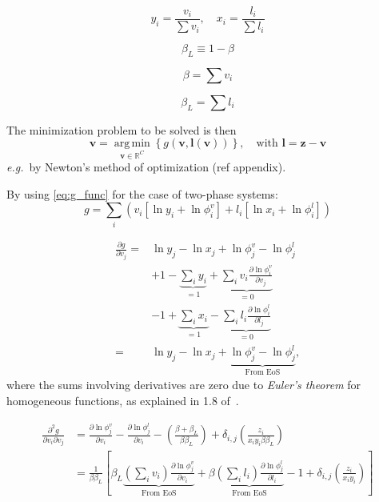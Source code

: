 \documentclass[english]{../thermomemo/thermomemo}
\newcommand*{\vektor}[1]{\boldsymbol{#1}}%
\DeclareMathOperator*{\argmin}{arg\,min }
\begin{document}
\begin{equation}
  y_i = \frac{v_i}{\sum v_i}, \quad x_i = \frac{l_i}{\sum l_i}
  \label{}
\end{equation}

\begin{equation}
  \beta_L \equiv 1-\beta
  \label{}
\end{equation}

\begin{equation}
  \beta = \sum v_i
  \label{}
\end{equation}

\begin{equation}
  \beta_L = \sum l_i
  \label{}
\end{equation}

The minimization problem to be solved is then 
\begin{equation}
  \vektor{v} = \underset{\vektor{v} \in \mathbb{R}^C}{\argmin}\left\{g(\vektor{v},\vektor{l}(\vektor{v}))\right\}, \quad\text{with } 
  \vektor{l} = \vektor{z}-\vektor{v}
  \label{}
\end{equation}
\textit{e.g.}\ by Newton's method of optimization (ref appendix).


By using \eqref{eq:g_func} for the case of two-phase systems:
\begin{equation}
  g = \sum_i \left( v_i \left[ \ln y_i + \ln \phi_i^v \right] + l_i \left[ \ln x_i + \ln \phi_i^l \right] \right)
  \label{eq:g_twophase}
\end{equation}

\begin{align}
  \frac{\partial g}{\partial v_j}
  =& \ln y_j - \ln x_j + \ln \phi_j^v - \ln \phi_j^l \nonumber\\
  &+ 1 - \underbrace{\sum_i y_i}_{=1} + \underbrace{\sum_i v_i \frac{\partial \ln \phi_i^v}{\partial v_j}}_{=0}\nonumber\\
  &- 1 + \underbrace{\sum_i x_i}_{=1} - \underbrace{\sum_i l_i \frac{\partial \ln \phi_i^l}{\partial l_j}}_{=0} \nonumber\\
  =& \ln y_j - \ln x_j + \underbrace{\ln \phi_j^v - \ln \phi_j^l}_{\text{From EoS}},
  \label{}
\end{align}
where the sums involving derivatives are zero due to \textit{Euler's theorem} for homogeneous functions, as explained in
1.8 of~\cite{michelsen07}.

\begin{align}
  \frac{\partial^2 g}{\partial v_i \partial v_j} 
  &= \frac{\partial \ln \phi_j^v}{\partial v_i} - \frac{\partial \ln \phi_j^l}{\partial v_i}  
  - \left( \frac{\beta + \beta_L}{\beta \beta_L} \right)
  + \delta_{i,j} \left( \frac{z_i}{x_i y_i \beta \beta_L} \right) \nonumber\\
  &= 
  \frac{1}{\beta \beta_L} \left[
  \beta_L \underbrace{\left( \sum_i v_i\right)  \frac{\partial \ln \phi_j^v}{\partial v_i} }_\text{From EoS}
  +  \beta \underbrace{\left( \sum_i l_i\right)  \frac{\partial \ln \phi_j^l}{\partial l_i}}_\text{From EoS}
  - 1
  + \delta_{i,j} \left( \frac{z_i}{x_i y_i} \right) 
  \right]\nonumber\\
  \label{}
\end{align}
\end{document}
